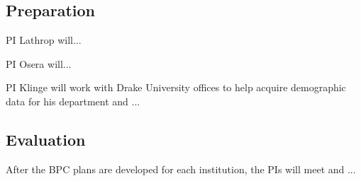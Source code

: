 \documentclass[11pt]{article}
\begin{document}
\subsection{Preparation}
PI Lathrop will...

PI Osera will...

PI Klinge will work with Drake University offices to help acquire demographic data for his department and ...

\subsection{Evaluation}
After the BPC plans are developed for each institution, the PIs will meet and ...

\end{document}
